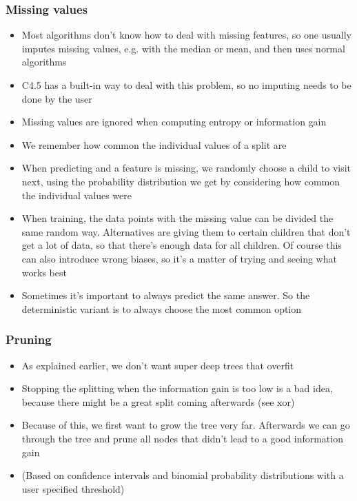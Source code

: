\documentclass[a4paper]{article}
\begin{document}
\subsubsection{Missing values}

\begin{itemize}
	\item Most algorithms don't know how to deal with missing features, so one usually imputes missing values, e.g. with the median or mean, and then uses normal algorithms
    \item C4.5 has a built-in way to deal with this problem, so no imputing needs to be done by the user
    \item Missing values are ignored when computing entropy or information gain
    \item We remember how common the individual values of a split are
    \item When predicting and a feature is missing, we randomly choose a child to visit next, using the probability distribution we get by considering how common the individual values were
    \item When training, the data points with the missing value can be divided the same random way. Alternatives are giving them to certain children that don't get a lot of data, so that there's enough data for all children. Of course this can also introduce wrong biases, so it's a matter of trying and seeing what works best
    \item Sometimes it's important to always predict the same answer. So the deterministic variant is to always choose the most common option
\end{itemize}

\subsubsection{Pruning}

\begin{itemize}
	\item As explained earlier, we don't want super deep trees that overfit
    \item Stopping the splitting when the information gain is too low is a bad idea, because there might be a great split coming afterwards (see xor)
    \item Because of this, we first want to grow the tree very far. Afterwards we can go through the tree and prune all nodes that didn't lead to a good information gain
    \item (Based on confidence intervals and binomial probability distributions with a user specified threshold)
\end{itemize}
\end{document}
